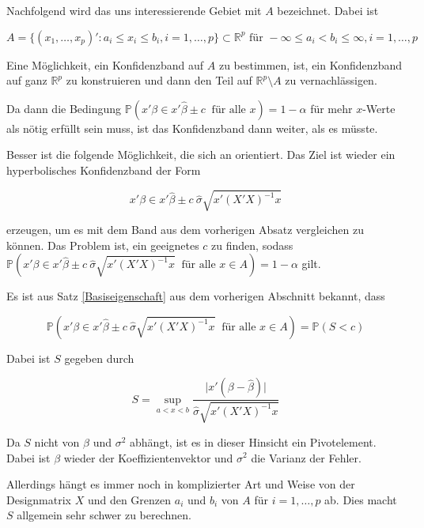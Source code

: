 \documentclass[12pt,a4paper]{article}
\theoremstyle{definition}
\theoremstyle{definition}
\theoremstyle{definition}
\theoremstyle{definition}
\begin{document}
Nachfolgend wird das uns interessierende Gebiet mit $A$ bezeichnet. Dabei ist 

\begin{equation*}
A = \{(x_1, \ldots, x_p)' : a_i \leq x_i \leq b_i, i = 1, \ldots, p \} \subset \mathbb{R}^p \text{ für } - \infty \leq a_i < b_i \leq \infty, i=1, \ldots, p
\end{equation*}

Eine Möglichkeit, ein Konfidenzband auf $A$ zu bestimmen, ist, ein Konfidenzband auf ganz $\mathbb{R}^p$ zu konstruieren und dann den Teil auf $\mathbb{R}^{p} \setminus A$ zu vernachlässigen.

Da dann die Bedingung $\mathbb{P}(x'\beta \in x' \hat{\beta} \pm c ~ \text{ für alle } x) = 1-\alpha$ für mehr $x$-Werte als nötig erfüllt sein muss, ist das Konfidenzband dann weiter, als es müsste.

Besser ist die folgende Möglichkeit, die sich an \cite[70]{Liu64} orientiert. Das Ziel ist wieder ein hyperbolisches Konfidenzband der Form 

\begin{equation}
x'\beta \in x' \hat{\beta} \pm c ~ \hat{\sigma} \sqrt{x' (X'X)^{-1}x} \label{hyperbolisches_KB}
\end{equation}

erzeugen, um es mit dem Band aus dem vorherigen Absatz vergleichen zu können. Das Problem ist, ein geeignetes $c$ zu finden, sodass $\mathbb{P}( x'\beta \in x' \hat{\beta} \pm c ~ \hat{\sigma} \sqrt{x' (X'X)^{-1}x} ~ \text{ für alle } x \in A) = 1-\alpha$ gilt.

Es ist aus Satz \ref{Basiseigenschaft} aus dem vorherigen Abschnitt bekannt, dass 

\begin{equation*}
\mathbb{P}( x'\beta \in x' \hat{\beta} \pm c ~ \hat{\sigma} \sqrt{x' (X'X)^{-1}x} ~ \text{ für alle } x \in A ) = \mathbb{P}(S<c)
\end{equation*}

Dabei ist $S$ gegeben durch 

\begin{equation*}
S = \sup_{a<x<b} \frac{\vert x'(\beta - \hat{\beta}) \vert}{\hat{\sigma} \sqrt{x'(X'X)^{-1}x}}
\end{equation*}

Da $S$ nicht von $\beta$ und $\sigma^2$ abhängt, ist es in dieser Hinsicht ein Pivotelement. Dabei ist $\beta$ wieder der Koeffizientenvektor und $\sigma^2$ die Varianz der Fehler. 

Allerdings hängt es immer noch in komplizierter Art und Weise von der Designmatrix $X$ und den Grenzen $a_i$ und $b_i$ von $A$ für $i=1, \ldots, p$ ab. Dies macht $S$ allgemein sehr schwer zu berechnen.
\end{document}

